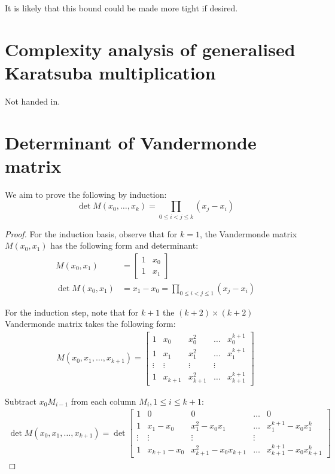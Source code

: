\documentclass[a4paper]{scrreprt}
\begin{document}
It is likely that this bound could be made more tight if desired.

\section{Complexity analysis of generalised Karatsuba multiplication}

Not handed in.

\section{Determinant of Vandermonde matrix}

We aim to prove the following by induction:
\[
		\det M(x_0, \ldots, x_k) = \prod_{0 \leq i < j \leq k} (x_j - x_i)
\]

\begin{proof}

For the induction basis, observe that for $k = 1$, the Vandermonde matrix
$M(x_0, x_1)$ has the following form and determinant:
\begin{align*}
		M(x_0, x_1) & = \begin{bmatrix}
				1 & x_0 \\
				1 & x _1
		\end{bmatrix} \\
		\det M(x_0, x_1) & = x_1 - x_0 = \prod_{0 \leq i < j \leq 1} (x_j - x_i)
\end{align*}

For the induction step, note that for $k + 1$ the $(k+2) \times (k+2)$
Vandermonde matrix takes the following form:
\begin{align*}
		M(x_0, x_1, \ldots, x_{k+1}) = \begin{bmatrix}
				1 & x_0  & x_0^2 & \ldots & x_0^{k+1} \\
				1 & x_1  & x_1^2 & \ldots & x_1^{k+1} \\
				\vdots & \vdots & \vdots & \vdots \\
				1 & x_{k+1}  & x_{k+1}^2 & \ldots & x_{k+1}^{k+1}
		\end{bmatrix}
\end{align*}

Subtract $x_0 M_{i-1}$ from each column $M_{i}, 1 \leq i \leq k+1$:
\begin{align*}
		\det M(x_0, x_1, \ldots, x_{k+1}) = \det \begin{bmatrix}
				1 & 0  & 0 & \ldots & 0 \\
				1 & x_1 - x_0 & x_1^2 - x_0 x_1 & \ldots & x_1^{k+1} - x_0 x_1^{k} \\
				\vdots & \vdots & \vdots & \vdots \\
				1 & x_{k+1} - x_0  & x_{k+1}^2 - x_0 x_{k+1} & \ldots & x_{k+1}^{k+1} - x_0 x_{k+1}^{k}
		\end{bmatrix}
\end{align*}


\end{proof}
\end{document}
